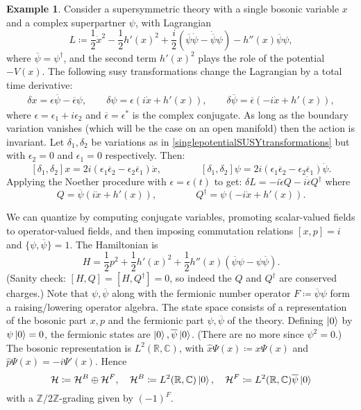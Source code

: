 \documentclass{report}
\theoremstyle{plain}
\theoremstyle{definition}
\newtheorem{example}[theorem]{Example}
\theoremstyle{remark}
\newcommand{\bC}{\mathbb{C}}
\newcommand{\bR}{\mathbb{R}}
\newcommand{\bZ}{\mathbb{Z}}
\newcommand{\cH}{\mathcal{H}}
\newcommand{\cnj}{\overline}
\newcommand{\FR}[2]{\frac{#1}{#2}}
\begin{document}
\begin{example} \label{ex:susy-1d-potential-theory}
  Consider a supersymmetric theory with a single bosonic variable $x$
  and a complex superpartner $\psi$, with Lagrangian
  \[ L \coloneqq \FR{1}{2} \dot x^2 - \FR{1}{2} h'(x)^2 + \FR{i}{2}\left( \cnj\psi\dot\psi - \dot{\cnj\psi}\psi \right) - h''(x)\cnj\psi\psi,\]
  where $\cnj\psi=\psi^\dagger$, and the second term $h'(x)^2$ plays
  the role of the potential $-V(x)$. The following susy
  transformations change the Lagrangian by a total time derivative:
  \begin{align}
    \delta x = \epsilon\cnj\psi-\cnj\epsilon\psi,\qquad
    \delta \psi=\epsilon(i\dot x+h'(x)),\qquad
    \delta\cnj\psi=\cnj\epsilon(-i\dot x+h'(x)),
    \label{singlepotentialSUSYtransformations}
  \end{align}
  where $\epsilon=\epsilon_1+i\epsilon_2$ and
  $\cnj\epsilon=\epsilon^*$ is the complex conjugate. As long as the
  boundary variation vanishes (which will be the case on an open
  manifold) then the action is invariant. Let $\delta_1,\delta_2$ be
  variations as in \eqref{singlepotentialSUSYtransformations} but with
  $\epsilon_2=0$ and $\epsilon_1=0$ respectively. Then:
  \[ [\delta_1,\delta_2]x =2i(\epsilon_1\cnj\epsilon_2 - \epsilon_2\cnj\epsilon_1)\dot x,\qquad\qquad [\delta_1,\delta_2]\psi = 2i(\epsilon_1\cnj\epsilon_2-\epsilon_2\cnj\epsilon_1)\dot\psi.\]
  Applying the Noether procedure with $\epsilon=\epsilon(t)$ to get:
  $\delta L = -i\dot\epsilon Q - i\dot{\cnj\epsilon}Q^\dag$
  where 
  \[Q=\cnj\psi(i\dot x+h'(x)),\qquad\qquad Q^\dag = \psi(-i\dot x+h'(x)).\]
  
  We can quantize by computing conjugate variables, promoting
  scalar-valued fields to operator-valued fields, and then imposing
  commutation relations $[x, p] = i$ and $\{\psi, \cnj\psi\} = 1$. The
  Hamiltonian is
  \[ H=\FR{1}{2}p^2+\FR{1}{2}h'(x)^2+\FR{1}{2}h''(x)(\cnj\psi\psi-\psi\cnj\psi). \]
  (Sanity check: $[H, Q] = [H, Q^\dag] = 0$, so indeed the $Q$ and
  $Q^\dag$ are conserved charges.) Note that $\psi, \cnj\psi$ along
  with the fermionic number operator $F \coloneqq \cnj\psi\psi$ form a
  raising/lowering operator algebra. The state space consists of a
  representation of the bosonic part $x, p$ and the fermionic part
  $\psi, \cnj\psi$ of the theory. Defining $\ket{0}$ by $\psi\ket{0} =
  0$, the fermionic states are $\ket{0}, \cnj\psi\ket{0}$. (There are
  no more since $\psi^2 = 0$.) The bosonic representation is $L^2(\bR,
  \bC)$, with $\hat{x}\Psi(x) \coloneqq x\Psi(x)$ and $\hat{p}\Psi(x)
  = -i\Psi'(x)$. Hence
  \[ \cH \coloneqq \cH^B \oplus \cH^F, \quad \cH^B \coloneqq L^2(\bR, \bC)\ket{0}, \quad \cH^F \coloneqq L^2(\bR, \bC)\cnj\psi\ket{0} \]
  with a $\bZ/2\bZ$-grading given by $(-1)^F$. 
\end{example}
\end{document}
